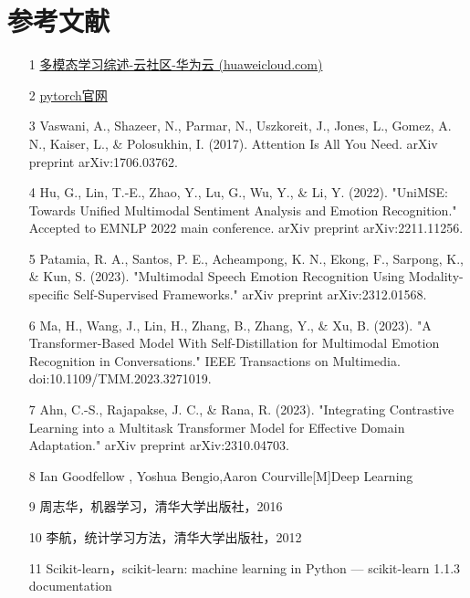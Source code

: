 \documentclass[11pt]{article}
\begin{document}
    \section{参考文献}
    \begin{enumerate}
        \item [1]\href{https://bbs.huaweicloud.com/blogs/264134?utm_source=zhihu&utm_medium=bbs-ex&utm_campaign=ei&utm_content=content}{多模态学习综述-云社区-华为云 (huaweicloud.com)}
        \item [2]\href{https://pytorch.org/tutorials/}{pytorch官网}
        \item [3]Vaswani, A., Shazeer, N., Parmar, N., Uszkoreit, J., Jones, L., Gomez, A. N., Kaiser, L., \& Polosukhin, I. (2017). Attention Is All You Need. arXiv preprint arXiv:1706.03762.
        \item [4]    Hu, G., Lin, T.-E., Zhao, Y., Lu, G., Wu, Y., \& Li, Y. (2022). "UniMSE: Towards Unified Multimodal Sentiment Analysis and Emotion Recognition." Accepted to EMNLP 2022 main conference. arXiv preprint arXiv:2211.11256.

        \item [5]Patamia, R. A., Santos, P. E., Acheampong, K. N., Ekong, F., Sarpong, K., \& Kun, S. (2023). "Multimodal Speech Emotion Recognition Using Modality-specific Self-Supervised Frameworks." arXiv preprint arXiv:2312.01568.

        \item [6]Ma, H., Wang, J., Lin, H., Zhang, B., Zhang, Y., \& Xu, B. (2023). "A Transformer-Based Model With Self-Distillation for Multimodal Emotion Recognition in Conversations." IEEE Transactions on Multimedia. doi:10.1109/TMM.2023.3271019.

        \item [7]Ahn, C.-S., Rajapakse, J. C., \& Rana, R. (2023). "Integrating Contrastive Learning into a Multitask Transformer Model for Effective Domain Adaptation." arXiv preprint arXiv:2310.04703.

        \item [8]Ian Goodfellow , Yoshua Bengio,Aaron Courville[M]Deep Learning 
        \item [9]周志华，机器学习，清华大学出版社，2016
        \item [10]李航，统计学习方法，清华大学出版社，2012
        \item [11]Scikit-learn，scikit-learn: machine learning in Python — scikit-learn 1.1.3 documentation

    \end{enumerate}
    





   
    
    
    
\end{document}
